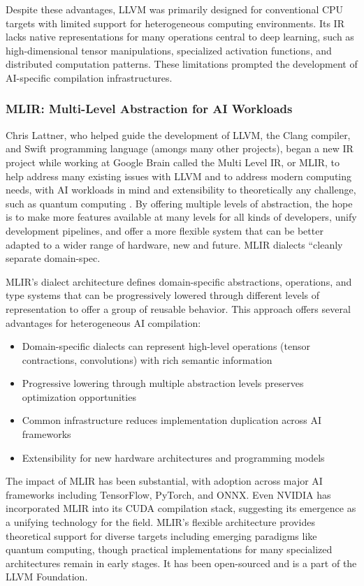 \documentclass[manuscript,screen,review,format=acmsmall]{acmart}
\begin{document}
Despite these advantages, LLVM was primarily designed for conventional CPU targets with limited support for heterogeneous computing environments. Its IR lacks native representations for many operations central to deep learning, such as high-dimensional tensor manipulations, specialized activation functions, and distributed computation patterns. These limitations prompted the development of AI-specific compilation infrastructures.

\subsubsection{MLIR: Multi-Level Abstraction for AI Workloads}

Chris Lattner, who helped guide the development of LLVM, the Clang compiler, and Swift programming language (amongs many other projects), began a new IR project while working at Google Brain called the Multi Level IR, or MLIR, to help address many existing issues with LLVM and to address modern computing needs, with AI workloads in mind and extensibility to theoretically any challenge, such as quantum computing \cite{LattnerChris2021Msci}. By offering multiple levels of abstraction, the hope is to make more features available at many levels for all kinds of developers, unify development pipelines, and offer a more flexible system that can be better adapted to a wider range of hardware, new and future. MLIR dialects “cleanly separate domain-spec\cite{Modular8}. 

MLIR's dialect architecture defines domain-specific abstractions, operations, and type systems that can be progressively lowered through different levels of representation to offer a group of reusable behavior. This approach offers several advantages for heterogeneous AI compilation:
\begin{itemize}
    \item Domain-specific dialects can represent high-level operations (tensor contractions, convolutions) with rich semantic information
    \item Progressive lowering through multiple abstraction levels preserves optimization opportunities
    \item Common infrastructure reduces implementation duplication across AI frameworks
    \item Extensibility for new hardware architectures and programming models
\end{itemize}

The impact of MLIR has been substantial, with adoption across major AI frameworks including TensorFlow, PyTorch, and ONNX. Even NVIDIA has incorporated MLIR into its CUDA compilation stack, suggesting its emergence as a unifying technology for the field. MLIR's flexible architecture provides theoretical support for diverse targets including emerging paradigms like quantum computing, though practical implementations for many specialized architectures remain in early stages. It has been open-sourced and is a part of the LLVM Foundation.
\end{document}
